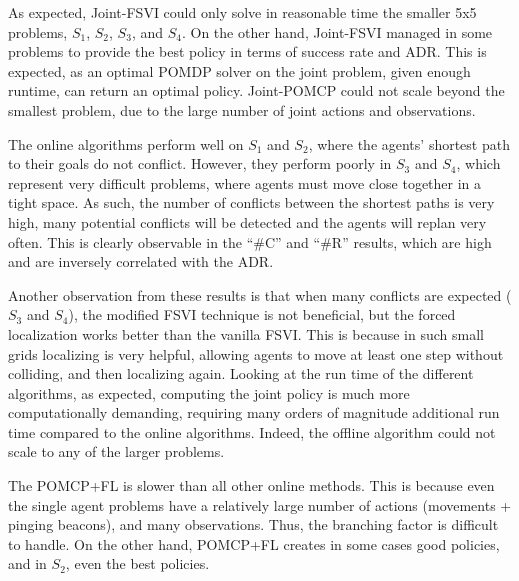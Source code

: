 \documentclass[letterpaper]{article} %
\begin{document}
As expected, Joint-FSVI could only solve in reasonable time the smaller 5x5 problems, $S_1$, $S_2$, $S_3$, and $S_4$. On the other hand, Joint-FSVI managed in some problems to provide the best policy in terms of success rate and ADR. This is expected, as an optimal POMDP solver on the joint problem, given enough runtime, can return an optimal policy. Joint-POMCP could not scale beyond  the smallest problem, due to the large number of joint actions and observations.



The online algorithms perform well on $S_1$ and $S_2$, where the agents' shortest path to their goals do not conflict. 
However, they perform poorly in $S_3$ and $S_4$, which represent very difficult problems, where agents must move close together in a tight space. As such, the number of conflicts between the shortest paths is very high, many potential conflicts will be detected and the agents will replan very often. This is clearly observable in the ``\#C'' and ``\#R'' results, which are high and are inversely correlated with the ADR.

Another observation from these results is that when many conflicts are expected ($S_3$ and $S_4$), the modified FSVI technique is not beneficial, but the forced localization works better than the vanilla FSVI. 
This is because in such small grids localizing is very helpful, allowing agents to move at least one step without colliding, and then localizing again. 
Looking at the run time of the different algorithms, as expected, computing the joint policy is much more computationally demanding, requiring many orders of magnitude additional run time compared to the online algorithms. Indeed, the offline algorithm could not scale to any of the larger problems. 

The POMCP+FL is slower than all other online methods. This is because even the single agent problems have a relatively large number of actions (movements + pinging beacons), and many observations. Thus, the branching factor is difficult to handle. On the other hand, POMCP+FL creates in some cases good policies, and in $S_2$, even the best policies.
\end{document}
